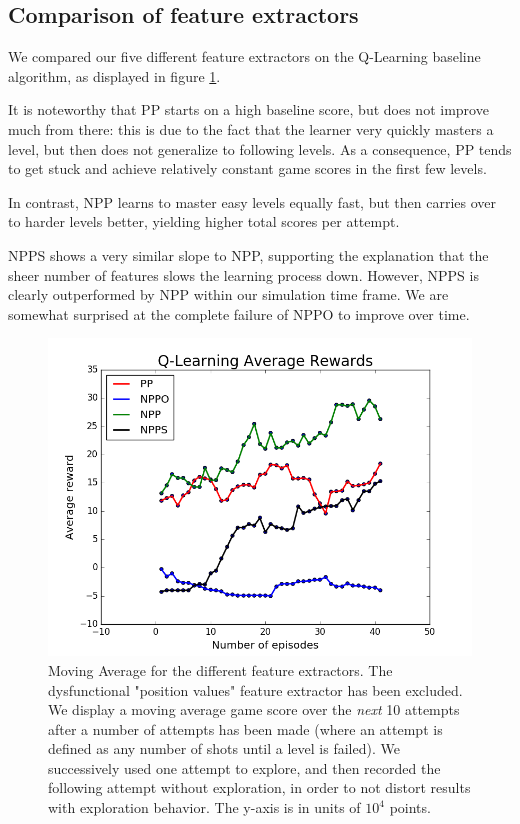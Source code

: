 \documentclass[fleqn,10pt]{SelfArx} %
\begin{document}
\subsection{Comparison of feature extractors}
We compared our five different feature extractors on the Q-Learning baseline algorithm, as displayed in figure \ref{fig:QAverageReward}.

It is noteworthy that PP starts on a high baseline score, but does not improve much from there: this is due to the fact that the learner very quickly masters a level, but then does not generalize to following levels. As a consequence, PP tends to get stuck and achieve relatively constant game scores in the first few levels.

In contrast, NPP learns to master easy levels equally fast, but then carries over to harder levels better, yielding higher total scores per attempt. 

NPPS shows a very similar slope to NPP, supporting the explanation that the sheer number of features slows the learning process down. However, NPPS is clearly outperformed by NPP within our simulation time frame. We are somewhat surprised at the complete failure of NPPO to improve over time.

\begin{figure}[ht]\centering
\includegraphics[width=\linewidth]{QAverageReward.png}
\caption{Moving Average for the different feature extractors. The dysfunctional "position values" feature extractor has been excluded. We display a moving average game score over the \emph{next} 10 attempts after a number of attempts has been made (where an attempt is defined as any number of shots until a level is failed). We successively used one attempt to explore, and then recorded the following attempt without exploration, in order to not distort results with exploration behavior. The y-axis is in units of $10^4$ points.}
\label{fig:QAverageReward}
\end{figure}
\end{document}

